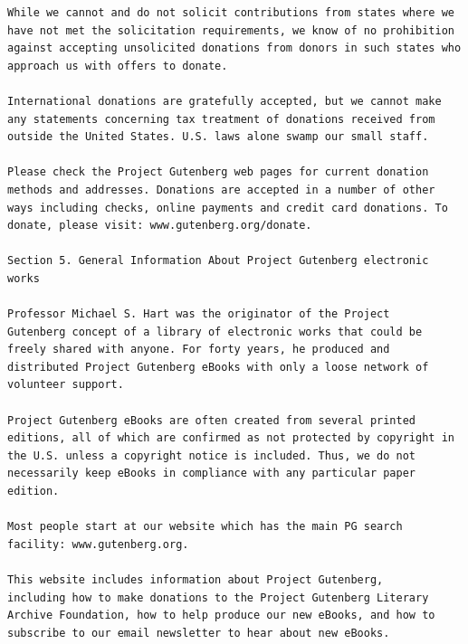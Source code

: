\documentclass{article}
\begin{document}
\begin{verbatim}
While we cannot and do not solicit contributions from states where we
have not met the solicitation requirements, we know of no prohibition
against accepting unsolicited donations from donors in such states who
approach us with offers to donate.

International donations are gratefully accepted, but we cannot make
any statements concerning tax treatment of donations received from
outside the United States. U.S. laws alone swamp our small staff.

Please check the Project Gutenberg web pages for current donation
methods and addresses. Donations are accepted in a number of other
ways including checks, online payments and credit card donations. To
donate, please visit: www.gutenberg.org/donate.

Section 5. General Information About Project Gutenberg electronic works

Professor Michael S. Hart was the originator of the Project
Gutenberg concept of a library of electronic works that could be
freely shared with anyone. For forty years, he produced and
distributed Project Gutenberg eBooks with only a loose network of
volunteer support.

Project Gutenberg eBooks are often created from several printed
editions, all of which are confirmed as not protected by copyright in
the U.S. unless a copyright notice is included. Thus, we do not
necessarily keep eBooks in compliance with any particular paper
edition.

Most people start at our website which has the main PG search
facility: www.gutenberg.org.

This website includes information about Project Gutenberg,
including how to make donations to the Project Gutenberg Literary
Archive Foundation, how to help produce our new eBooks, and how to
subscribe to our email newsletter to hear about new eBooks.



\end{verbatim}
\end{document}
